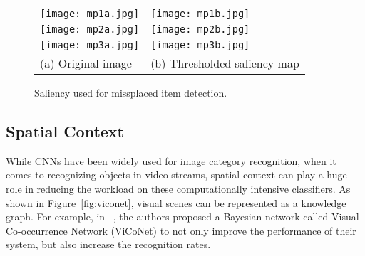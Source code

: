 \begin{figure}[!htb]
\centering
\begin{tabular}{@{}l@{} @{}l@{}}
\vspace{-5pt}
\texttt{[image: mp1a.jpg]} & \texttt{[image: mp1b.jpg]}\\[\abovecaptionskip]
\texttt{[image: mp2a.jpg]} & \texttt{[image: mp2b.jpg]}\\[\abovecaptionskip]
\texttt{[image: mp3a.jpg]} & \texttt{[image: mp3b.jpg]}\\[\abovecaptionskip]
\small(a) Original image & \small (b) Thresholded saliency map\\
\end{tabular}
\caption{Saliency used for missplaced item detection.}
\label{tab:saliencya}
\end{figure}


\subsection{Spatial Context}
While CNNs have been widely used for image category recognition, when it comes to recognizing objects in video streams, spatial context can play a huge role in 
reducing the workload on these computationally intensive classifiers. As shown in Figure~\ref{fig:viconet}, visual scenes can be represented as a knowledge graph.   
For example, in ~\cite{estimedia2015}, the authors proposed a Bayesian network called Visual Co-occurrence Network (ViCoNet) to not only improve the performance of their system, but also increase the recognition rates.

